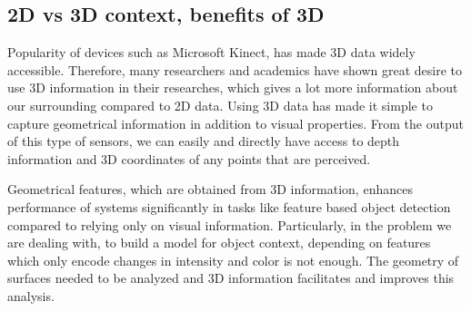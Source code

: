 % 
% 
% 

\subsection{2D vs 3D context, benefits of 3D}
Popularity of devices such as Microsoft Kinect, has made 3D data widely accessible. 
Therefore, many researchers and academics have shown great desire to use 3D information in their researches, 
which gives a lot more information about our surrounding compared to 2D data. 
Using 3D data has made it simple to capture geometrical information in addition to visual properties. 
From the output of this type of sensors, we can easily and directly have access to depth information and 3D 
coordinates of any points that are perceived.

Geometrical features, which are obtained from 3D information, enhances performance of systems significantly in tasks like feature 
based object detection compared to relying only on visual information. 
Particularly, in the problem we are dealing with, to build a model for object context, depending on features which only encode 
changes in intensity and color is not enough. The geometry of surfaces needed to be analyzed and 3D information facilitates and improves this analysis.
